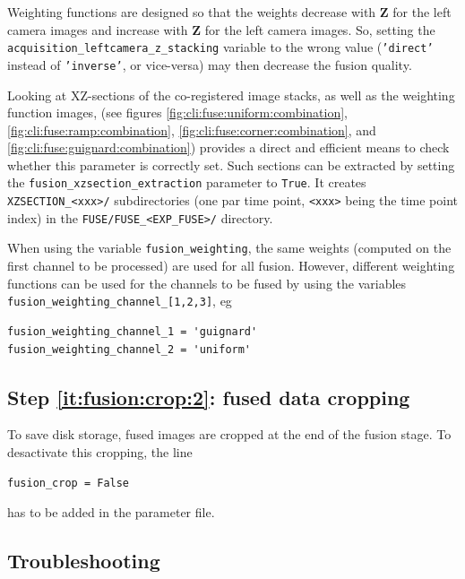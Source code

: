 Weighting functions are designed so that the weights decrease with \textbf{Z} for the left camera images and increase with \textbf{Z} for the left camera images. So, setting the \texttt{acquisition\_leftcamera\_z\_stacking} variable to the wrong value (\texttt{'direct'} instead of \texttt{'inverse'}, or vice-versa) may then decrease the fusion quality. 

Looking at XZ-sections of the co-registered image stacks, as well as the weighting function images, (see figures \ref{fig:cli:fuse:uniform:combination}, \ref{fig:cli:fuse:ramp:combination}, \ref{fig:cli:fuse:corner:combination}, and \ref{fig:cli:fuse:guignard:combination}) provides a direct and efficient means to check whether this parameter is correctly set. Such sections can be extracted by setting the \texttt{fusion\_xzsection\_extraction} parameter to \texttt{True}. It creates \texttt{XZSECTION\_<xxx>/} subdirectories (one par time point, \texttt{<xxx>} being the time point index) in the \texttt{FUSE/FUSE\_<EXP\_FUSE>/} directory.

\mbox{}
\mbox{}


When using the variable \texttt{fusion\_weighting}, the same weights (computed on the first channel to be processed) are used for all fusion. However, different weighting functions can be used for the channels to be fused by using the variables  \texttt{fusion\_weighting\_channel\_[1,2,3]}, eg
\begin{verbatim}
fusion_weighting_channel_1 = 'guignard'
fusion_weighting_channel_2 = 'uniform'
\end{verbatim}


\subsection{Step \ref{it:fusion:crop:2}: fused data cropping}
\label{sec:cli:fuse:fused:data:cropping}

To save disk storage, fused images are cropped at the end of the fusion stage. To desactivate this cropping, the line
\begin{verbatim}
fusion_crop = False
\end{verbatim}
has to be added in the parameter file.

\subsection{Troubleshooting}

